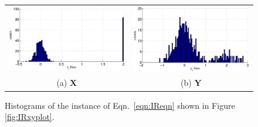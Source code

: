 \documentclass{article}[10pt]
\begin{document}
\begin{figure}[ht]
\begin{tabular}{cc}
\includegraphics[scale=0.5]{NoisyResponseExample_Xhist.eps} & \includegraphics[scale=0.5]{NoisyResponseExample_Yhist.eps} \\
(a) $\mathbf{X}$ & (b) $\mathbf{Y}$
\end{tabular}
\caption{Histograms of the instance of Eqn.\ \ref{eqn:IReqn} shown in Figure \ref{fig:IRxyplot}.}
\label{fig:IRxyhist}
\end{figure}
\end{document}
